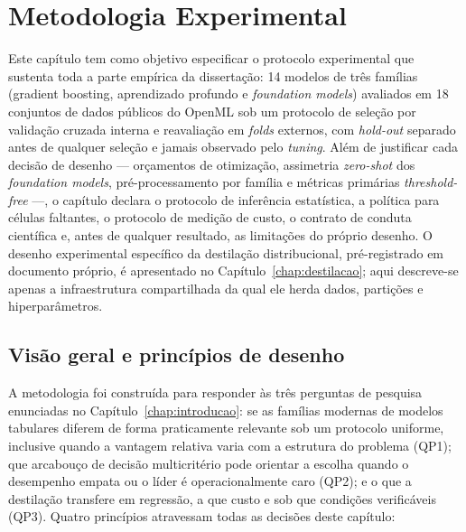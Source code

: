 \chapter{Metodologia Experimental}
\label{chap:metodologia}

Este capítulo tem como objetivo especificar o protocolo experimental que
sustenta toda a parte empírica da dissertação: 14 modelos de três famílias
(gradient boosting, aprendizado profundo e \emph{foundation models})
avaliados em 18 conjuntos de dados públicos do OpenML sob um protocolo
de seleção por validação cruzada interna e reavaliação em \emph{folds}
externos, com \emph{hold-out} separado antes de qualquer seleção e jamais
observado pelo \emph{tuning}. Além de justificar cada decisão de desenho ---
orçamentos de otimização, assimetria \emph{zero-shot} dos \emph{foundation
models}, pré-processamento por família e métricas primárias
\emph{threshold-free} ---, o capítulo declara o protocolo de inferência
estatística, a política para células faltantes, o protocolo de medição de
custo, o contrato de conduta científica e, antes de qualquer resultado, as
limitações do próprio desenho. O desenho experimental específico da
destilação distribucional, pré-registrado em documento próprio, é
apresentado no Capítulo~\ref{chap:destilacao}; aqui descreve-se apenas a
infraestrutura compartilhada da qual ele herda dados, partições e
hiperparâmetros.

\section{Visão geral e princípios de desenho}
\label{sec:met-visao}

A metodologia foi construída para responder às três perguntas de pesquisa
enunciadas no Capítulo~\ref{chap:introducao}: se as famílias modernas de
modelos tabulares diferem de forma praticamente relevante sob um protocolo
uniforme, inclusive quando a vantagem relativa varia com a estrutura do
problema (QP1); que arcabouço de decisão multicritério pode orientar a
escolha quando o desempenho empata ou o líder é operacionalmente caro
(QP2); e o que a destilação transfere em regressão, a que custo e sob que
condições verificáveis (QP3). Quatro
princípios atravessam todas as decisões deste capítulo:

